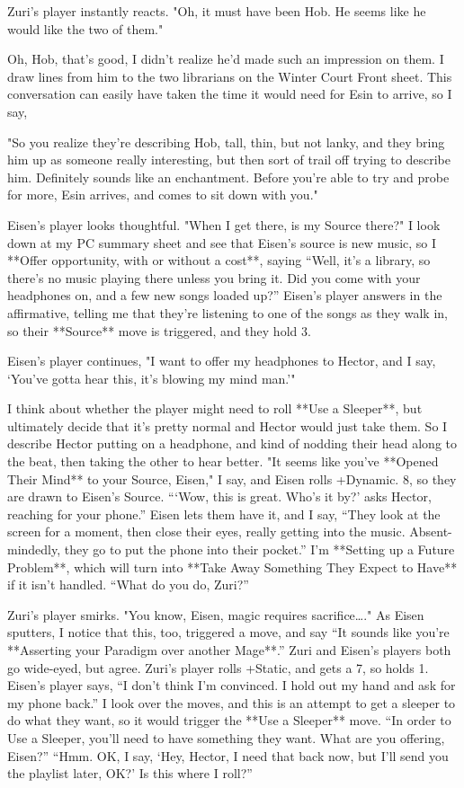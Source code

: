 \documentclass[
  oneside,
  statementpaper,
  9pt]{memoir}
\begin{document}
\begin{MC}
Zuri’s player instantly reacts. "Oh, it must have been Hob. He seems like he would like the two of them."

Oh, Hob, that’s good, I didn’t realize he’d made such an impression on them. I draw lines from him to the two librarians on the Winter Court Front sheet. This conversation can easily have taken the time it would need for Esin to arrive, so I say,

"So you realize they’re describing Hob, tall, thin, but not lanky, and they bring him up as someone really interesting, but then sort of trail off trying to describe him. Definitely sounds like an enchantment. Before you’re able to try and probe for more, Esin arrives, and comes to sit down with you."

Eisen’s player looks thoughtful. "When I get there, is my Source there?" I look down at my PC summary sheet and see that Eisen’s source is new music, so I **Offer opportunity, with or without a cost**, saying “Well, it’s a library, so there’s no music playing there unless you bring it. Did you come with your headphones on, and a few new songs loaded up?” Eisen’s player answers in the affirmative, telling me that they’re listening to one of the songs as they walk in, so their **Source** move is triggered, and they hold 3. 

Eisen’s player continues, "I want to offer my headphones to Hector, and I say, ‘You’ve gotta hear this, it’s blowing my mind man.’"

I think about whether the player might need to roll **Use a Sleeper**, but ultimately decide that it’s pretty normal and Hector would just take them. So I describe Hector putting on a headphone, and kind of nodding their head along to the beat, then taking the other to hear better. "It seems like you’ve **Opened Their Mind** to your Source, Eisen," I say, and Eisen rolls +Dynamic. 8, so they are drawn to Eisen’s Source. “‘Wow, this is great. Who’s it by?’ asks Hector, reaching for your phone.” Eisen lets them have it, and I say, “They look at the screen for a moment, then close their eyes, really getting into the music. Absent-mindedly, they go to put the phone into their pocket.” I’m **Setting up a Future Problem**, which will turn into **Take Away Something They Expect to Have** if it isn’t handled. “What do you do, Zuri?”

Zuri’s player smirks. "You know, Eisen, magic requires sacrifice…." As Eisen sputters, I notice that this, too, triggered a move, and say “It sounds like you’re **Asserting your Paradigm over another Mage**.” Zuri and Eisen’s players both go wide-eyed, but agree. Zuri’s player rolls +Static, and gets a 7, so holds 1. Eisen’s player says, “I don’t think I’m convinced. I hold out my hand and ask for my phone back.” I look over the moves, and this is an attempt to get a sleeper to do what they want, so it would trigger the **Use a Sleeper** move. “In order to Use a Sleeper, you’ll need to have something they want. What are you offering, Eisen?” “Hmm. OK, I say, ‘Hey, Hector, I need that back now, but I’ll send you the playlist later, OK?’ Is this where I roll?”


\end{MC}
\end{document}
